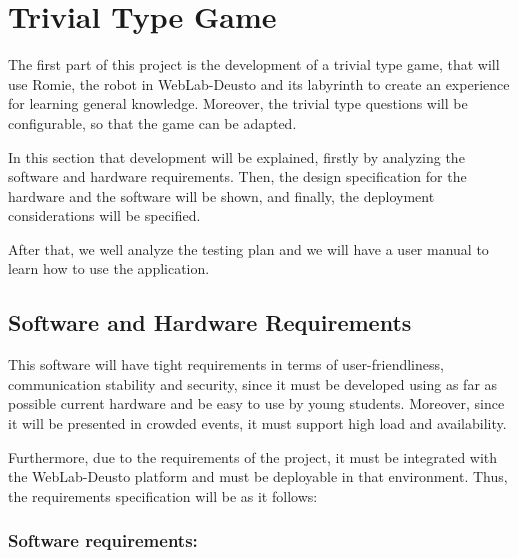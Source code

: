 \section{Trivial Type Game}

The first part of this project is the development of a trivial type game, that will use Romie, the
robot in WebLab-Deusto and its labyrinth to create an experience for learning general knowledge.
Moreover, the trivial type questions will be configurable, so that the game can be adapted.

In this section that development will be explained, firstly by analyzing the software and hardware
requirements. Then, the design specification for the hardware and the software will be shown, and
finally, the deployment considerations will be specified.

After that, we well analyze the testing plan and we will have a user manual to learn how to use the
application.

\subsection{Software and Hardware Requirements}

This software will have tight requirements in terms of user-friendliness, communication stability
and security, since it must be developed using as far as possible current hardware and be easy to
use by young students. Moreover, since it will be presented in crowded events, it must support high
load and availability.

Furthermore, due to the requirements of the project, it must be integrated with the WebLab-Deusto
platform and must be deployable in that environment. Thus, the requirements specification will be
as it follows:

\subsubsection{Software requirements:}

